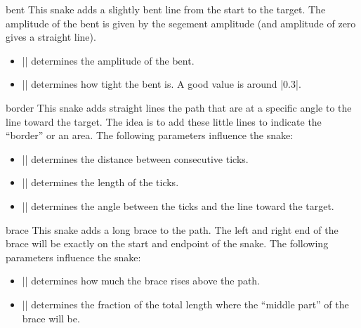 \begin{snake}{bent}
  This snake adds a slightly bent line from the start to the
  target. The amplitude of the bent is given by the segement amplitude
  (and amplitude of zero gives a straight line). 
  \begin{itemize}
  \item |\pgfsnakesegmentamplitude|
    determines the amplitude of the bent.
  \item |\pgfsnakesegmentaspect|
    determines how tight the bent is. A good value is around |0.3|. 
  \end{itemize}
\begin{codeexample}[]
\end{codeexample}
\end{snake}



\begin{snake}{border}
  This snake adds straight lines the path that are at a specific angle
  to the line toward the target. The idea is to add these little lines
  to indicate the ``border'' or an area. The following parameters
  influence the snake:  
  \begin{itemize}
  \item |\pgfsnakesegmentlength|
    determines the distance between consecutive ticks.
  \item |\pgfsnakesegmentamplitude|
    determines the length of the ticks.
  \item |\pgfsnakesegmentangle|
    determines the angle between the ticks and the line toward the
    target. 
  \end{itemize}
\begin{codeexample}[]
\end{codeexample}
\end{snake}


\begin{snake}{brace}
  This snake adds a long brace to the path. The left and right end of
  the brace will be exactly on the start and endpoint of the
  snake. The following parameters influence the snake:  
  \begin{itemize}
  \item |\pgfsnakesegmentamplitude|
    determines how much the brace rises above the path.
  \item |\pgfsnakesegmentaspect|
    determines the fraction of the total length where the ``middle
    part'' of the brace will be.  
  \end{itemize}
\begin{codeexample}[]
\end{codeexample}
\end{snake}

